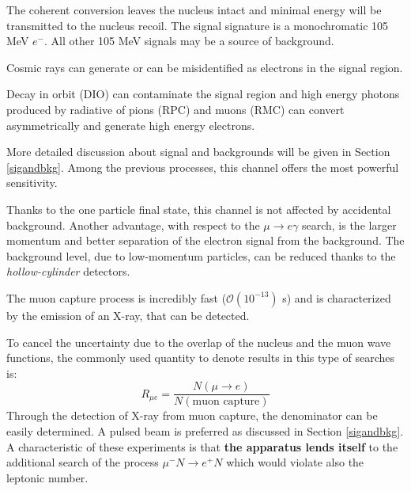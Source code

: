 The coherent conversion leaves the nucleus
intact and minimal energy will be transmitted to the nucleus recoil.
The signal signature is a monochromatic 105 MeV $e^-$.
{\violet All other 105 MeV signals may be a source of background. }


Cosmic rays can generate or can be misidentified as electrons in the signal region.


Decay in orbit (DIO) can contaminate the signal region and high energy photons produced
by radiative  of pions (RPC) and muons (RMC) can convert 
asymmetrically and generate high energy electrons.


More detailed discussion about signal and backgrounds will be given in Section \ref{sigandbkg}.
{\violet Among the previous processes, this channel offers the most powerful sensitivity.}


Thanks to the one particle final state, this channel is not affected by accidental background.
Another advantage, with respect to the $\mu \rightarrow e \gamma$ search, is the larger momentum
and better separation of the electron signal from the background.
The background level, due to low-momentum particles, can be reduced
thanks to the \textit{hollow-cylinder} detectors.


{\violet The muon capture process is incredibly fast ($\mathcal{O}(10^{-13})$ s)
  and is characterized by the emission of an X-ray, that can be detected.}


To cancel the uncertainty due to the overlap of the nucleus and the muon wave
functions, the commonly used quantity to denote results in this type of searches is:
\begin{equation}
    R_{\mu e}=\frac{N(\mu \rightarrow e)}{N(\text{muon capture})}
\end{equation}
Through the detection of X-ray from muon capture, the denominator can be easily determined.
A pulsed beam is preferred as discussed in Section \ref{sigandbkg}.
A characteristic of these experiments is that {\bf \red the apparatus lends itself} to the additional
search of the process $\mu^- N \rightarrow e^+ N$ which would violate also the leptonic number.

